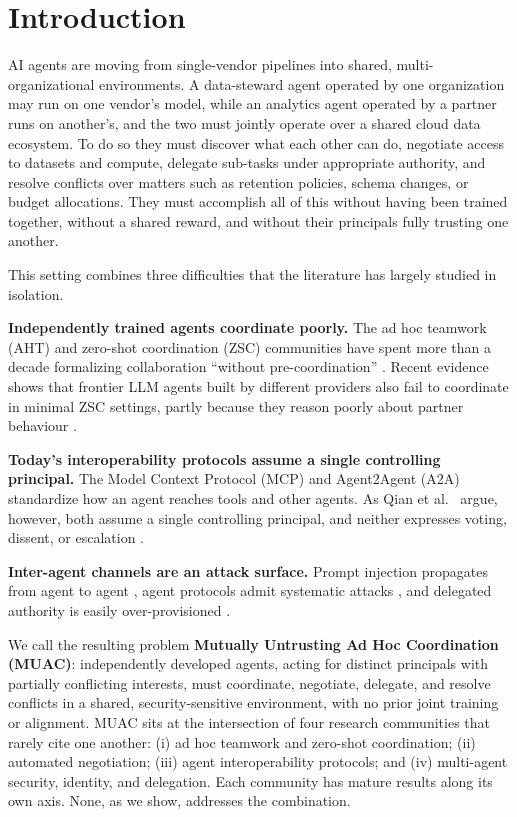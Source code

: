 \documentclass[conference]{IEEEtran}
\begin{document}
\section{Introduction}\label{sec-1}

AI agents are moving from single-vendor pipelines into shared, multi-organizational environments. A data-steward agent operated by one organization may run on one vendor's model, while an analytics agent operated by a partner runs on another's, and the two must jointly operate over a shared cloud data ecosystem. To do so they must discover what each other can do, negotiate access to datasets and compute, delegate sub-tasks under appropriate authority, and resolve conflicts over matters such as retention policies, schema changes, or budget allocations. They must accomplish all of this without having been trained together, without a shared reward, and without their principals fully trusting one another.

This setting combines three difficulties that the literature has largely studied in isolation.

\textbf{Independently trained agents coordinate poorly.} The ad hoc teamwork (AHT) and zero-shot coordination (ZSC) communities have spent more than a decade formalizing collaboration ``without pre-coordination'' \cite{stone2010adhoc, mirsky2022survey, hu2020otherplay}. Recent evidence shows that frontier LLM agents built by different providers also fail to coordinate in minimal ZSC settings, partly because they reason poorly about partner behaviour \cite{hayler2026zsc}.

\textbf{Today's interoperability protocols assume a single controlling principal.} The Model Context Protocol (MCP) \cite{anthropic2024mcp} and Agent2Agent (A2A) \cite{google2025a2a} standardize how an agent reaches tools and other agents. As Qian et al.~\cite{qian2026mpac} argue, however, both assume a single controlling principal, and neither expresses voting, dissent, or escalation \cite{kang2026governance}.

\textbf{Inter-agent channels are an attack surface.} Prompt injection propagates from agent to agent \cite{lee2024prompt, an2026aciarena}, agent protocols admit systematic attacks \cite{lotfi2026a2abreak}, and delegated authority is easily over-provisioned \cite{south2025authenticated, veski2026capmas}.

We call the resulting problem \textbf{Mutually Untrusting Ad Hoc Coordination (MUAC)}: independently developed agents, acting for distinct principals with partially conflicting interests, must coordinate, negotiate, delegate, and resolve conflicts in a shared, security-sensitive environment, with no prior joint training or alignment. MUAC sits at the intersection of four research communities that rarely cite one another: (i) ad hoc teamwork and zero-shot coordination; (ii) automated negotiation; (iii) agent interoperability protocols; and (iv) multi-agent security, identity, and delegation. Each community has mature results along its own axis. None, as we show, addresses the combination.
\end{document}

